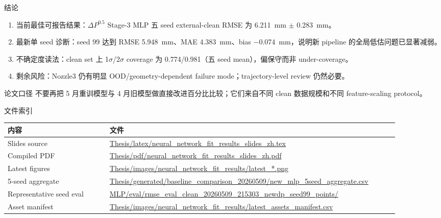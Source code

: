 \documentclass[aspectratio=169,11pt]{beamer}
\newcommand{\goodtext}[1]{\textcolor{green!45!black}{#1}}
\newcommand{\warntext}[1]{\textcolor{red!65!black}{#1}}
\newcommand{\notetext}[1]{\textcolor{blue!65!black}{#1}}
\newcommand{\pathtext}[1]{{\scriptsize\url{#1}}}
\begin{document}
\begin{frame}{结论}
\small
\begin{enumerate}
  \item \goodtext{当前最佳可报告结果}：\(\Delta P^{0.5}\) Stage-3 MLP 五 seed external-clean RMSE 为 \SI{6.211}{mm} \(\pm\) \SI{0.283}{mm}。
  \item \goodtext{最新单 seed 诊断}：seed 99 达到 RMSE \SI{5.948}{mm}、MAE \SI{4.383}{mm}、bias \SI{-0.074}{mm}，说明新 pipeline 的全局低估问题已显著减弱。
  \item \notetext{不确定度读法}：clean set 上 1\(\sigma\)/2\(\sigma\) coverage 为 0.774/0.981（五 seed mean），偏保守而非 under-coverage。
  \item \warntext{剩余风险}：Nozzle3 仍有明显 OOD/geometry-dependent failure mode；trajectory-level review 仍然必要。
\end{enumerate}

\begin{block}{论文口径}
不要再把 5 月重训模型与 4 月旧模型做直接改进百分比比较；它们来自不同 clean 数据规模和不同 feature-scaling protocol。
\end{block}
\end{frame}

\begin{frame}{文件索引}
\small
\begin{tabular}{L{0.24\linewidth}L{0.68\linewidth}}
\toprule
内容 & 文件 \\
\midrule
Slides source & \pathtext{Thesis/latex/neural_network_fit_results_slides_zh.tex} \\
Compiled PDF & \pathtext{Thesis/pdf/neural_network_fit_results_slides_zh.pdf} \\
Latest figures & \pathtext{Thesis/images/neural_network_fit_results/latest_*.png} \\
5-seed aggregate & \pathtext{Thesis/generated/baseline_comparison_20260509/new_mlp_5seed_aggregate.csv} \\
Representative seed eval & \pathtext{MLP/eval/rmse_eval_clean_20260509_215303_newdp_seed99_points/} \\
Asset manifest & \pathtext{Thesis/images/neural_network_fit_results/latest_assets_manifest.csv} \\
\bottomrule
\end{tabular}
\end{frame}
\end{document}
